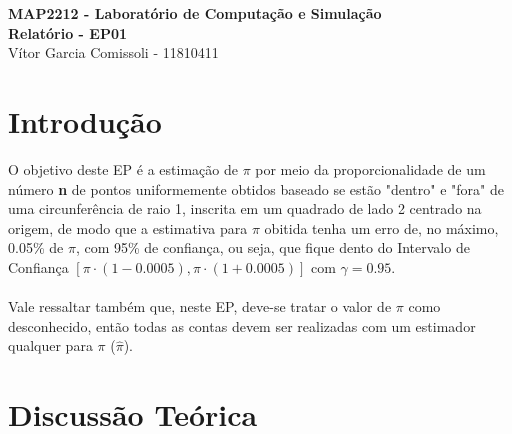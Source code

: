\documentclass{article}
\begin{document}
\begin{center}
    \textbf{\LARGE MAP2212 - Laboratório de Computação e Simulação}\\
    \vspace{0.3cm}
    \textbf{\Large Relatório - EP01}\\
    \vspace{0.3cm}
    \large{Vítor Garcia Comissoli - 11810411}
\end{center}

\section{Introdução}

    O objetivo deste EP é a estimação de $\pi$ por meio da proporcionalidade de um número \textbf{n} de pontos uniformemente obtidos baseado se estão "dentro" e "fora" de uma circunferência de raio 1, inscrita em um quadrado de lado 2 centrado na origem, de modo que a estimativa para $\pi$ obitida tenha um erro de, no máximo, 0.05\% de $\pi$, com 95\% de confiança, ou seja, que fique dento do Intervalo de Confiança $[\pi\cdot(1 - 0.0005),\pi\cdot(1 + 0.0005)]$ com $\gamma=0.95$.\\
    \\
    Vale ressaltar também que, neste EP, deve-se tratar o valor de $\pi$ como desconhecido, então todas as contas devem ser realizadas com um estimador qualquer para $\pi$ ($\hat{\pi}$).

\section{Discussão Teórica}
\end{document}
